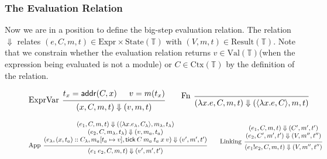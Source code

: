 \documentclass[acmsmall,review]{acmart}\settopmatter{printfolios=true,printccs=false,printacmref=false}
\theoremstyle{definition}
\newcommand*{\cons}{::}
\newcommand*{\Expr}{\text{Expr}}
\newcommand*{\Time}{\mathbb{T}}
\newcommand*{\Ctx}[1]{\text{Ctx}({#1})}
\newcommand*{\Value}[1]{\text{Val}({#1})}
\newcommand*{\mem}{m}
\newcommand*{\State}[1]{\text{State}({#1})}
\newcommand*{\Result}[1]{\text{Result}({#1})}
\newcommand*{\link}[2]{{#1}\mathtt{!}{#2}}
\newcommand*{\addr}{\mathsf{addr}}
\newcommand*{\tick}{\mathsf{tick}}
\begin{document}
\subsubsection{The Evaluation Relation}

Now we are in a position to define the big-step evaluation relation.
The relation $\Downarrow$ relates $(e,C,\mem,t)\in\Expr\times\State{\Time}$ with
$(V,\mem,t)\in\Result{\Time}$.
Note that we constrain whether the evaluation relation returns $v\in\Value{\Time}$(when the expression being evaluated is not a module) or $C\in\Ctx{\Time}$ by the definition of the relation.

\begin{figure}[h!]
  \begin{flushright}\fbox{$(e,C,\mem,t)\Downarrow(V,\mem',t')$}\end{flushright}
  \vspace{0pt} %
  \footnotesize
  \[
    \begin{prooftree}
      \hypo{t_{x}=\addr(C,x)}
      \hypo{v=\mem(t_{x})}
      \infer[left label=ExprVar]2{
      (x, C, \mem, t)
      \Downarrow
      (v, \mem, t)
      }
    \end{prooftree}\qquad
    \begin{prooftree}
      \infer[left label=Fn]0{
      (\lambda x.e, C, \mem, t)
      \Downarrow
      (\langle\lambda x.e, C\rangle, \mem, t)
      }
    \end{prooftree}
  \]

  \[
    \begin{prooftree}
      \hypo{
        \begin{matrix}
          (e_{1}, C, \mem, t)
          \Downarrow
          (\langle\lambda x.e_{\lambda}, C_{\lambda}\rangle, \mem_{\lambda}, t_{\lambda}) \\
          (e_{2}, C, \mem_{\lambda}, t_{\lambda})
          \Downarrow
          (v, \mem_{a}, t_{a})                                                            \\
          (e_{\lambda}, (x, t_{a})\cons C_{\lambda}, \mem_{a}[t_{a}\mapsto v], \tick\:C\:\mem_{a}\:t_{a}\:x\:v)
          \Downarrow
          (v', \mem',t')
        \end{matrix}
      }
      \infer[left label={App}]1{
      (e_{1}\:e_{2}, C, \mem, t)
      \Downarrow
      (v', \mem',t')
      }
    \end{prooftree}\qquad
    \begin{prooftree}
      \hypo{
        \begin{matrix}
          (e_{1}, C, \mem, t)
          \Downarrow
          (C', \mem', t') \\
          (e_{2}, C', \mem', t')
          \Downarrow
          (V, \mem'', t'')
        \end{matrix}
      }
      \infer[left label=Linking]1{
      (\link{e_{1}}{e_{2}}, C, \mem, t)
      \Downarrow
      (V, \mem'', t'')
      }
    \end{prooftree}
  \]


\end{figure}
\end{document}
